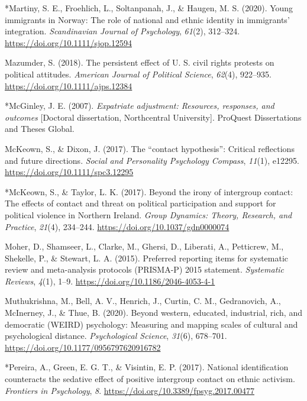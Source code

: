 \documentclass[12pt, letterpaper]{article}
\begin{document}
\leavevmode\hypertarget{ref-3005}{}%
*Martiny, S. E., Froehlich, L., Soltanpanah, J., \& Haugen, M. S.
(2020). Young immigrants in Norway: The role of national and ethnic
identity in immigrants' integration. \emph{Scandinavian Journal of
Psychology}, \emph{61}(2), 312--324.
\url{https://doi.org/10.1111/sjop.12594}

\leavevmode\hypertarget{ref-mazumder_persistent_2018}{}%
Mazumder, S. (2018). The persistent effect of U. S. civil rights
protests on political attitudes. \emph{American Journal of Political
Science}, \emph{62}(4), 922--935.
\url{https://doi.org/10.1111/ajps.12384}

\leavevmode\hypertarget{ref-1850}{}%
*McGinley, J. E. (2007). \emph{Expatriate adjustment: Resources,
responses, and outcomes} {[}Doctoral dissertation, Northcentral
University{]}. ProQuest Dissertations and Theses Global.

\leavevmode\hypertarget{ref-mckeown_contact_2017}{}%
McKeown, S., \& Dixon, J. (2017). The ``contact hypothesis'': Critical
reflections and future directions. \emph{Social and Personality
Psychology Compass}, \emph{11}(1), e12295.
\url{https://doi.org/10.1111/spc3.12295}

\leavevmode\hypertarget{ref-1376}{}%
*McKeown, S., \& Taylor, L. K. (2017). Beyond the irony of intergroup
contact: The effects of contact and threat on political participation
and support for political violence in Northern Ireland. \emph{Group
Dynamics: Theory, Research, and Practice}, \emph{21}(4), 234--244.
\url{https://doi.org/10.1037/gdn0000074}

\leavevmode\hypertarget{ref-moher_preferred_2015}{}%
Moher, D., Shamseer, L., Clarke, M., Ghersi, D., Liberati, A.,
Petticrew, M., Shekelle, P., \& Stewart, L. A. (2015). Preferred
reporting items for systematic review and meta-analysis protocols
(PRISMA-P) 2015 statement. \emph{Systematic Reviews}, \emph{4}(1), 1--9.
\url{https://doi.org/10.1186/2046-4053-4-1}

\leavevmode\hypertarget{ref-muthukrishna_beyond_2020}{}%
Muthukrishna, M., Bell, A. V., Henrich, J., Curtin, C. M., Gedranovich,
A., McInerney, J., \& Thue, B. (2020). Beyond western, educated,
industrial, rich, and democratic (WEIRD) psychology: Measuring and
mapping scales of cultural and psychological distance.
\emph{Psychological Science}, \emph{31}(6), 678--701.
\url{https://doi.org/10.1177/0956797620916782}

\leavevmode\hypertarget{ref-4004}{}%
*Pereira, A., Green, E. G. T., \& Visintin, E. P. (2017). National
identification counteracts the sedative effect of positive intergroup
contact on ethnic activism. \emph{Frontiers in Psychology}, \emph{8}.
\url{https://doi.org/10.3389/fpsyg.2017.00477}
\end{document}
